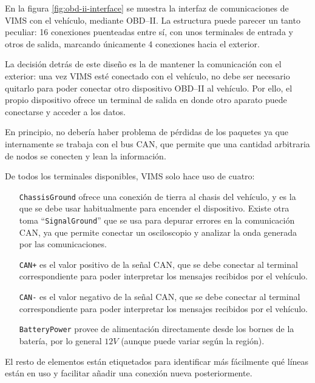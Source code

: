 En la figura \ref{fig:obd-ii-interface} se muestra la interfaz de comunicaciones
de \ac{VIMS} con el vehículo, mediante \ac{OBD}--II. La estructura puede parecer
un tanto peculiar: 16 conexiones puenteadas entre sí, con unos terminales de entrada
y otros de salida, marcando únicamente 4 conexiones hacia el exterior.

La decisión detrás de este diseño es la de mantener la comunicación con el exterior:
una vez \ac{VIMS} esté conectado con el vehículo, no debe ser necesario quitarlo para
poder conectar otro dispositivo \ac{OBD}--II al vehículo. Por ello, el propio dispositivo
ofrece un terminal de salida en donde otro aparato puede conectarse y acceder a los datos.

En principio, no debería haber problema de pérdidas de los paquetes ya que internamente
se trabaja con el bus \ac{CAN}, que permite que una cantidad arbitraria de nodos se
conecten y lean la información.

De todos los terminales disponibles, \ac{VIMS} solo hace uso de cuatro:

\begin{enumerate}
  \item[\texttt{ChassisGround}] ofrece una conexión de tierra al chasis del vehículo,
    y es la que se debe usar habitualmente para encender el dispositivo. Existe otra
    toma ``\texttt{SignalGround}'' que se usa para depurar errores en la comunicación
    \ac{CAN}, ya que permite conectar un osciloscopio y analizar la onda generada
    por las comunicaciones.
  \item[\texttt{CAN+}] es el valor positivo de la señal \ac{CAN}, que se debe conectar
    al terminal correspondiente para poder interpretar los mensajes recibidos por
    el vehículo.
  \item[\texttt{CAN-}] es el valor negativo de la señal \ac{CAN}, que se debe conectar
    al terminal correspondiente para poder interpretar los mensajes recibidos por
    el vehículo.
  \item[\texttt{BatteryPower}] provee de alimentación directamente desde los bornes de
    la batería, por lo general $12V$ (aunque puede variar según la región).
\end{enumerate}

El resto de elementos están etiquetados para identificar más fácilmente qué líneas
están en uso y facilitar añadir una conexión nueva posteriormente.

